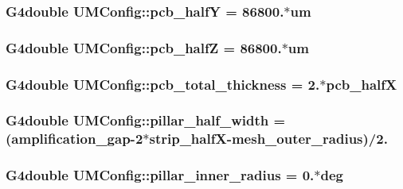 \subsubsection[{pcb\+\_\+half\+Y}]{\setlength{\rightskip}{0pt plus 5cm}G4double U\+M\+Config\+::pcb\+\_\+half\+Y = 86800.$\ast$um}\label{structUMConfig_a6c1fe8140f1fd3613eb3d4b1f77ca13e}
\hypertarget{structUMConfig_a05fe3c41c98a76ff002c175229aedecc}{}
\subsubsection[{pcb\+\_\+half\+Z}]{\setlength{\rightskip}{0pt plus 5cm}G4double U\+M\+Config\+::pcb\+\_\+half\+Z = 86800.$\ast$um}\label{structUMConfig_a05fe3c41c98a76ff002c175229aedecc}
\hypertarget{structUMConfig_a667115049ce41cb868af4d313aba742b}{}
\subsubsection[{pcb\+\_\+total\+\_\+thickness}]{\setlength{\rightskip}{0pt plus 5cm}G4double U\+M\+Config\+::pcb\+\_\+total\+\_\+thickness = 2.$\ast${\bf pcb\+\_\+half\+X}}\label{structUMConfig_a667115049ce41cb868af4d313aba742b}
\hypertarget{structUMConfig_a0d4cb234021fd28b6cc327845d1db9cc}{}
\subsubsection[{pillar\+\_\+half\+\_\+width}]{\setlength{\rightskip}{0pt plus 5cm}G4double U\+M\+Config\+::pillar\+\_\+half\+\_\+width = ({\bf amplification\+\_\+gap}-\/2$\ast${\bf strip\+\_\+half\+X}-\/{\bf mesh\+\_\+outer\+\_\+radius})/2.}\label{structUMConfig_a0d4cb234021fd28b6cc327845d1db9cc}
\hypertarget{structUMConfig_aa4b9f6ec239968ac2c4b4047b7ff32c5}{}
\subsubsection[{pillar\+\_\+inner\+\_\+radius}]{\setlength{\rightskip}{0pt plus 5cm}G4double U\+M\+Config\+::pillar\+\_\+inner\+\_\+radius = 0.$\ast$deg}\label{structUMConfig_aa4b9f6ec239968ac2c4b4047b7ff32c5}
\hypertarget{structUMConfig_ad952040a5b58ca3cbf4023319f4a2af6}{}
